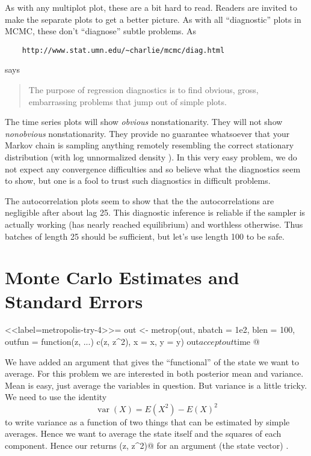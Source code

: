 \documentclass{article}
\DeclareMathOperator{\var}{var}
\begin{document}
	As with any multiplot plot, these are a bit hard to read.  Readers are
	invited to make the separate plots to get a better picture.
	As with all ``diagnostic'' plots in MCMC, these don't ``diagnose''
	subtle problems.  As
	\begin{verbatim}
	http://www.stat.umn.edu/~charlie/mcmc/diag.html
	\end{verbatim}
	says
	\begin{quotation}
		The purpose of regression diagnostics is to find obvious, gross,
		embarrassing problems that jump out of simple plots.
	\end{quotation}
	The time series plots will show \emph{obvious} nonstationarity.
	They will not show \emph{nonobvious} nonstationarity.  They
	provide no guarantee whatsoever that your Markov chain is sampling
	anything remotely resembling the correct stationary distribution
	(with log unnormalized density \verb@lupost@).  In this very easy
	problem, we do not expect any convergence difficulties and so believe
	what the diagnostics seem to show, but one is a fool to trust such
	diagnostics in difficult problems.
	
	The autocorrelation plots seem to show that the
	the autocorrelations are negligible after about lag 25.
	This diagnostic inference is reliable if the sampler is actually
	working (has nearly reached equilibrium) and worthless otherwise.
	Thus batches of length 25 should be sufficient, but let's use
	length 100 to be safe.
	
	\section{Monte Carlo Estimates and Standard Errors}
	
	<<label=metropolis-try-4>>=
	out <- metrop(out, nbatch = 1e2, blen = 100,
	outfun = function(z, ...) c(z, z^2), x = x, y = y)
	out$accept
	out$time
	@
	
	We have added an argument \verb@outfun@ that gives the ``functional''
	of the state we want to average.  For this problem we are interested
	in both posterior mean and variance.  Mean is easy, just average the
	variables in question.  But variance is a little tricky.  We need to
	use the identity
	$$
	\var(X) = E(X^2) - E(X)^2
	$$
	to write variance as a function of two things that can be estimated
	by simple averages.  Hence we want to average the state itself and
	the squares of each component.  Hence our \verb@outfun@ returns
	\verb@c(z, z^2)@ for an argument (the state vector) \verb@z@.
	
\end{document}
